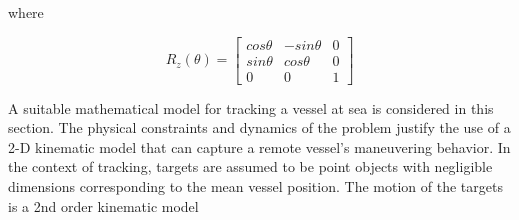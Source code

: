 where

$$
R_{z}(\theta)=\begin{bmatrix}
cos\theta &-sin\theta &0\\
sin\theta &cos\theta &0 \\
0 &0 &1
\end{bmatrix}
$$


A suitable mathematical model for tracking a vessel at sea is considered in this section. The physical constraints and dynamics of the problem justify the use of a 2-D kinematic model that can capture a remote vessel's maneuvering behavior. In the context of tracking, targets are assumed to be point objects with negligible dimensions corresponding to the mean vessel position. The motion of the targets is a 2nd order kinematic model